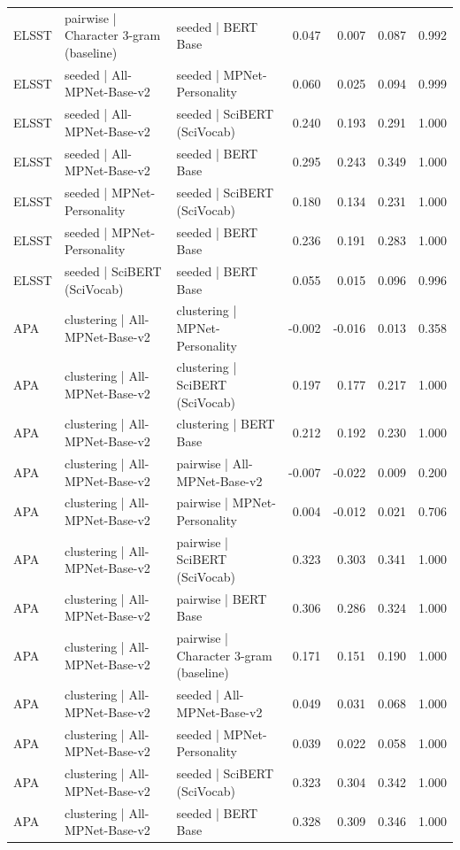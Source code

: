 \begin{table}[ht]
\begin{tabular}{lllrrrr}
ELSST & pairwise | Character 3-gram (baseline) & seeded | BERT Base & 0.047 & 0.007 & 0.087 & 0.992 \\
ELSST & seeded | All-MPNet-Base-v2 & seeded | MPNet-Personality & 0.060 & 0.025 & 0.094 & 0.999 \\
ELSST & seeded | All-MPNet-Base-v2 & seeded | SciBERT (SciVocab) & 0.240 & 0.193 & 0.291 & 1.000 \\
ELSST & seeded | All-MPNet-Base-v2 & seeded | BERT Base & 0.295 & 0.243 & 0.349 & 1.000 \\
ELSST & seeded | MPNet-Personality & seeded | SciBERT (SciVocab) & 0.180 & 0.134 & 0.231 & 1.000 \\
ELSST & seeded | MPNet-Personality & seeded | BERT Base & 0.236 & 0.191 & 0.283 & 1.000 \\
ELSST & seeded | SciBERT (SciVocab) & seeded | BERT Base & 0.055 & 0.015 & 0.096 & 0.996 \\
APA & clustering | All-MPNet-Base-v2 & clustering | MPNet-Personality & -0.002 & -0.016 & 0.013 & 0.358 \\
APA & clustering | All-MPNet-Base-v2 & clustering | SciBERT (SciVocab) & 0.197 & 0.177 & 0.217 & 1.000 \\
APA & clustering | All-MPNet-Base-v2 & clustering | BERT Base & 0.212 & 0.192 & 0.230 & 1.000 \\
APA & clustering | All-MPNet-Base-v2 & pairwise | All-MPNet-Base-v2 & -0.007 & -0.022 & 0.009 & 0.200 \\
APA & clustering | All-MPNet-Base-v2 & pairwise | MPNet-Personality & 0.004 & -0.012 & 0.021 & 0.706 \\
APA & clustering | All-MPNet-Base-v2 & pairwise | SciBERT (SciVocab) & 0.323 & 0.303 & 0.341 & 1.000 \\
APA & clustering | All-MPNet-Base-v2 & pairwise | BERT Base & 0.306 & 0.286 & 0.324 & 1.000 \\
APA & clustering | All-MPNet-Base-v2 & pairwise | Character 3-gram (baseline) & 0.171 & 0.151 & 0.190 & 1.000 \\
APA & clustering | All-MPNet-Base-v2 & seeded | All-MPNet-Base-v2 & 0.049 & 0.031 & 0.068 & 1.000 \\
APA & clustering | All-MPNet-Base-v2 & seeded | MPNet-Personality & 0.039 & 0.022 & 0.058 & 1.000 \\
APA & clustering | All-MPNet-Base-v2 & seeded | SciBERT (SciVocab) & 0.323 & 0.304 & 0.342 & 1.000 \\
APA & clustering | All-MPNet-Base-v2 & seeded | BERT Base & 0.328 & 0.309 & 0.346 & 1.000 \\

\end{tabular}
\end{table}
